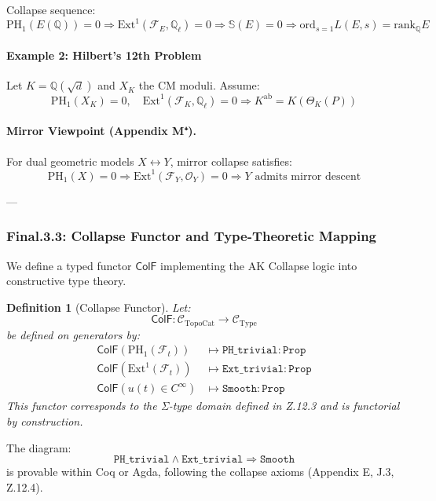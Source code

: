 \documentclass[11pt]{article}
\newcommand{\Sha}{\mathbb{S}}
\newtheorem{definition}[theorem]{Definition}
\begin{document}
\begin{axiom}
\begin{axiom}
{{Collapse sequence:
\[
\mathrm{PH}_1(E(\mathbb{Q})) = 0 \Rightarrow \mathrm{Ext}^1(\mathcal{F}_E, \mathbb{Q}_\ell) = 0 
\Rightarrow \Sha(E) = 0
\Rightarrow \mathrm{ord}_{s=1} L(E,s) = \mathrm{rank}_{\mathbb{Q}} E
\]

\paragraph{Example 2: Hilbert’s 12th Problem}
Let \( K = \mathbb{Q}(\sqrt{d}) \) and \( X_K \) the CM moduli. Assume:
\[
\mathrm{PH}_1(X_K) = 0, \quad \mathrm{Ext}^1(\mathcal{F}_K, \mathbb{Q}_\ell) = 0
\Rightarrow K^{\mathrm{ab}} = K(\Theta_K(P))
\]

\paragraph{Mirror Viewpoint (Appendix M⁺).}
For dual geometric models \( X \leftrightarrow Y \), mirror collapse satisfies:
\[
\mathrm{PH}_1(X) = 0 \Rightarrow \mathrm{Ext}^1(\mathcal{F}_Y, \mathcal{O}_Y) = 0
\Rightarrow Y \text{ admits mirror descent}
\]

---

\subsubsection*{Final.3.3: Collapse Functor and Type-Theoretic Mapping}

We define a typed functor \( \mathsf{ColF} \) implementing the AK Collapse logic into constructive type theory.

\begin{definition}[Collapse Functor]
Let:
\[
\mathsf{ColF} : \mathcal{C}_{\mathrm{TopoCat}} \longrightarrow \mathcal{C}_{\mathrm{Type}}
\]
be defined on generators by:
\[
\begin{aligned}
\mathsf{ColF}(\mathrm{PH}_1(\mathcal{F}_t)) &\mapsto \texttt{PH\_trivial} : \texttt{Prop} \\
\mathsf{ColF}(\mathrm{Ext}^1(\mathcal{F}_t)) &\mapsto \texttt{Ext\_trivial} : \texttt{Prop} \\
\mathsf{ColF}(u(t) \in C^\infty) &\mapsto \texttt{Smooth} : \texttt{Prop}
\end{aligned}
\]
This functor corresponds to the Σ-type domain defined in Z.12.3 and is functorial by construction.
\end{definition}

\begin{proposition}
The diagram:
\[
\texttt{PH\_trivial} \land \texttt{Ext\_trivial} \Rightarrow \texttt{Smooth}
\]
is provable within Coq or Agda, following the collapse axioms (Appendix E, J.3, Z.12.4).


\end{proposition}}}
\end{axiom}
\end{axiom}
\end{document}
